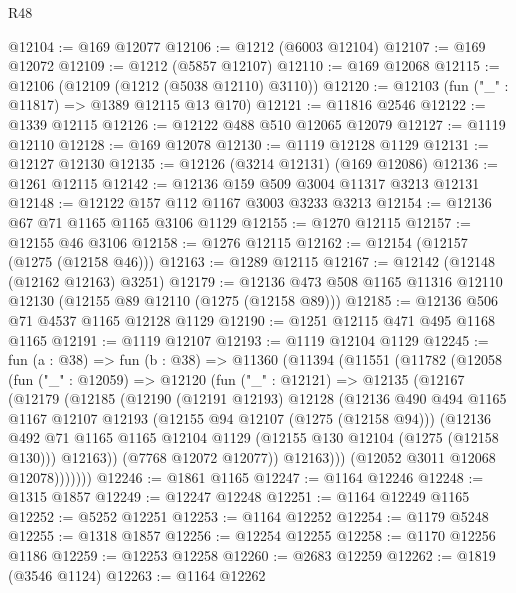\begin{lexlean}{R48}
\begin{coremodule}
@12104 := @169 @12077
@12106 := @1212 (@6003 @12104)
@12107 := @169 @12072
@12109 := @1212 (@5857 @12107)
@12110 := @169 @12068
@12115 := @12106 (@12109 (@1212 (@5038 @12110) @3110))
@12120 := @12103 (fun ("_" : @11817) => @1389 @12115 @13 @170)
@12121 := @11816 @2546
@12122 := @1339 @12115
@12126 := @12122 @488 @510 @12065 @12079
@12127 := @1119 @12110
@12128 := @169 @12078
@12130 := @1119 @12128 @1129
@12131 := @12127 @12130
@12135 := @12126 (@3214 @12131) (@169 @12086)
@12136 := @1261 @12115
@12142 := @12136 @159 @509 @3004 @11317 @3213 @12131
@12148 := @12122 @157 @112 @1167 @3003 @3233 @3213
@12154 := @12136 @67 @71 @1165 @1165 @3106 @1129
@12155 := @1270 @12115
@12157 := @12155 @46 @3106
@12158 := @1276 @12115
@12162 := @12154 (@12157 (@1275 (@12158 @46)))
@12163 := @1289 @12115
@12167 := @12142 (@12148 (@12162 @12163) @3251)
@12179 := @12136 @473 @508 @1165 @11316 @12110 @12130 (@12155 @89 @12110 (@1275 (@12158 @89)))
@12185 := @12136 @506 @71 @4537 @1165 @12128 @1129
@12190 := @1251 @12115 @471 @495 @1168 @1165
@12191 := @1119 @12107
@12193 := @1119 @12104 @1129
@12245 := fun (a : @38) =>
  fun (b : @38) =>
  @11360
    (@11394
      (@11551
        (@11782
          (@12058
            (fun ("_" : @12059) =>
            @12120
              (fun ("_" : @12121) =>
              @12135
                (@12167
                  (@12179
                    (@12185
                      (@12190
                        (@12191 @12193)
                        @12128
                        (@12136
                          @490
                          @494
                          @1165
                          @1167
                          @12107
                          @12193
                          (@12155 @94 @12107 (@1275 (@12158 @94)))
                          (@12136
                            @492
                            @71
                            @1165
                            @1165
                            @12104
                            @1129
                            (@12155 @130 @12104 (@1275 (@12158 @130)))
                            @12163))
                        (@7768 @12072 @12077))
                      @12163)))
                (@12052 @3011 @12068 @12078)))))))
@12246 := @1861 @1165
@12247 := @1164 @12246
@12248 := @1315 @1857
@12249 := @12247 @12248
@12251 := @1164 @12249 @1165
@12252 := @5252 @12251
@12253 := @1164 @12252
@12254 := @1179 @5248
@12255 := @1318 @1857
@12256 := @12254 @12255
@12258 := @1170 @12256 @1186
@12259 := @12253 @12258
@12260 := @2683 @12259
@12262 := @1819 (@3546 @1124)
@12263 := @1164 @12262

\end{coremodule}
\end{lexlean}
